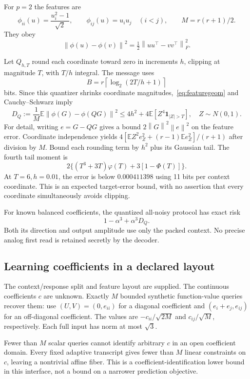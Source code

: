 \documentclass[11pt]{article}
\newcommand{\E}{\mathbb E}
\newcommand{\norm}[1]{\left\lVert#1\right\rVert}
\begin{document}
For $p=2$ the features are
\[
\phi_{ii}(u)=\frac{u_i^2-1}{\sqrt2},\qquad
\phi_{ij}(u)=u_iu_j\quad(i<j),\qquad M=r(r+1)/2.
\]
They obey
\begin{equation}
\norm{\phi(u)-\phi(v)}^2=\tfrac12\norm{uu^\top-vv^\top}_F^2.
\label{eq:featuregeom}
\end{equation}

Let $Q_{h,T}$ round each coordinate toward zero in increments $h$, clipping at magnitude $T$, with $T/h$ integral. The message uses
\[
B=r\left\lceil\log_2(2T/h+1)\right\rceil
\]
bits. Since this quantizer shrinks coordinate magnitudes,~\eqref{eq:featuregeom} and Cauchy--Schwarz imply
\begin{equation}
D_Q:=\frac1M\E\norm{\phi(G)-\phi(QG)}^2
\le4h^2+4\E[Z^4\mathbf1_{|Z|>T}],\quad Z\sim N(0,1).
\label{eq:quant}
\end{equation}
For detail, writing $e=G-QG$ gives a bound $2\norm{G}^2\norm e^2$ on the feature error. Coordinate independence yields $4[\E Z^2e_Z^2+(r-1)\E e_Z^2]/(r+1)$ after division by $M$. Bound each rounding term by $h^2$ plus its Gaussian tail. The fourth tail moment is
\[
2\{(T^3+3T)\varphi(T)+3[1-\Phi(T)]\}.
\]
At $T=6,h=0.01$, the error is below $0.000411398$ using 11 bits per context coordinate. This is an expected target-error bound, with no assertion that every coordinate simultaneously avoids clipping.

For known balanced coefficients, the quantized all-noisy protocol has exact risk
\[
1-\alpha^3+\alpha^3D_Q.
\]
Both its direction and output amplitude use only the packed context. No precise analog first read is retained secretly by the decoder.

\subsection{Learning coefficients in a declared layout}

The context/response split and feature layout are supplied. The continuous coefficients $c$ are unknown. Exactly $M$ bounded synthetic function-value queries recover them: use $(U,V)=(0,e_{ii})$ for a diagonal coefficient and $(e_i+e_j,e_{ij})$ for an off-diagonal coefficient. The values are $-c_{ii}/\sqrt{2M}$ and $c_{ij}/\sqrt M$, respectively. Each full input has norm at most $\sqrt3$.

Fewer than $M$ scalar queries cannot identify arbitrary $c$ in an open coefficient domain. Every fixed adaptive transcript gives fewer than $M$ linear constraints on $c$, leaving a nontrivial affine fiber. This is a coefficient-identification lower bound in this interface, not a bound on a narrower prediction objective.
\end{document}
